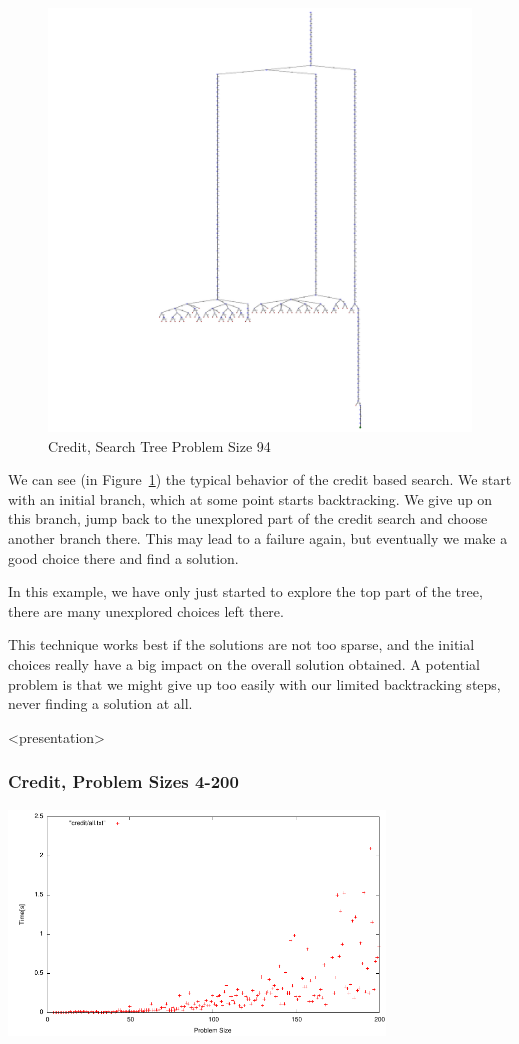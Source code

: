 \begin{figure}[h]
\caption{\label{nqueen:credittree}Credit, Search Tree Problem Size 94}
\begin{center}
\includegraphics[width=12cm]{../nqueen/credit/tree_302}
\end{center}
\end{figure}

We can see (in Figure~\ref{nqueen:credittree}) the typical behavior of the credit based search. We start with an initial branch, which at some point starts backtracking. We give up on this branch, jump back to the unexplored part of the credit search and choose another branch there. This may lead to a failure again, but eventually we make a good choice there and find a solution. 

In this example, we have only just started to explore the top part of the tree, there are many unexplored choices left there. 

This technique works best if the solutions are not too sparse, and the initial choices really have a big impact on the overall solution obtained. A potential problem is that we might give up too easily with our limited backtracking steps, never finding a solution at all.


\begin{frame}<presentation>
\frametitle{Credit, Problem Sizes 4-200}
\includegraphics[width=10cm]{../nqueen/credit/all200}
\end{frame}

